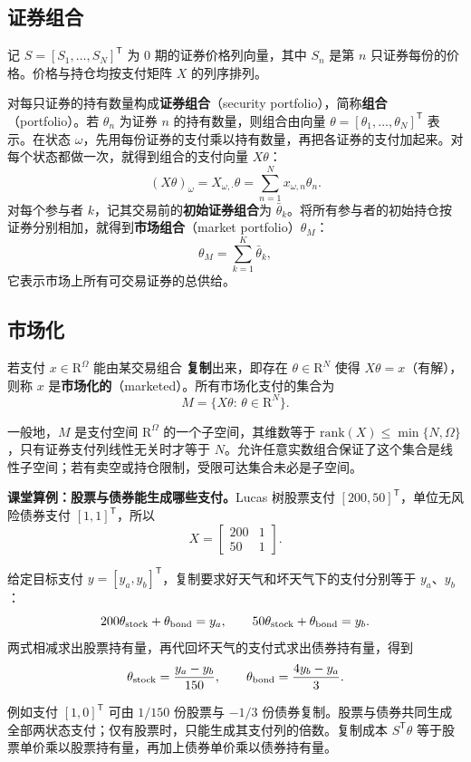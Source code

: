 \subsection{证券组合}
记 $S=[S_1,\ldots,S_N]^{\mathsf T}$ 为 $0$ 期的证券价格列向量，其中 $S_n$ 是第 $n$ 只证券每份的价格。价格与持仓均按支付矩阵 $X$ 的列序排列。

\begin{tcolorbox}[knowledge,title=证券组合与市场组合]
对每只证券的持有数量构成\textbf{证券组合}（security portfolio），简称\textbf{组合}（portfolio）。若 $\theta_n$ 为证券 $n$ 的持有数量，则组合由向量 $\theta=[\theta_1,\ldots,\theta_N]^{\mathsf T}$ 表示。在状态 $\omega$，先用每份证券的支付乘以持有数量，再把各证券的支付加起来。对每个状态都做一次，就得到组合的支付向量 $X\theta$：
    \[
        (X\theta)_\omega=X_{\omega,\cdot}\theta
        =\sum_{n=1}^N x_{\omega,n}\theta_n.
    \]
对每个参与者 $k$，记其交易前的\textbf{初始证券组合}为 $\bar\theta_k$。将所有参与者的初始持仓按证券分别相加，就得到\textbf{市场组合}（market portfolio）$\theta_M$：
    \[
        \theta_M=\sum_{k=1}^{K}\bar{\theta}_k,
    \]
    它表示市场上所有可交易证券的总供给。
\end{tcolorbox}

\subsection{市场化}
\label{sec:wj-two-marketed}
\begin{tcolorbox}[knowledge,title=市场化支付与支付空间]
若支付 $x\in\mathrm{R}^{\Omega}$ 能由某交易组合 \textbf{复制}出来，即存在 $\theta\in\mathrm{R}^{N}$ 使得 $X\theta=x$（有解），则称 $x$ 是\textbf{市场化的}（marketed）。所有市场化支付的集合为
    \[
        M=\{X\theta:\,\theta\in\mathrm{R}^{N}\}.
    \]
\end{tcolorbox}

一般地，$M$ 是支付空间 $\mathrm{R}^{\Omega}$ 的一个子空间，其维数等于 $\mathrm{rank}(X)\le\min\{N,\Omega\}$，只有证券支付列线性无关时才等于 $N$。允许任意实数组合保证了这个集合是线性子空间；若有卖空或持仓限制，受限可达集合未必是子空间。

\begin{tcolorbox}[example]
\textbf{课堂算例：股票与债券能生成哪些支付。}Lucas 树股票支付 $[200,50]^{\mathsf T}$，单位无风险债券支付 $[1,1]^{\mathsf T}$，所以
\[
 X=\begin{bmatrix}200&1\\50&1\end{bmatrix}.
\]

给定目标支付 $y=[y_a,y_b]^{\mathsf T}$，复制要求好天气和坏天气下的支付分别等于 $y_a$、$y_b$：
\[
 200\theta_{\rm stock}+\theta_{\rm bond}=y_a,\qquad
 50\theta_{\rm stock}+\theta_{\rm bond}=y_b.
\]
两式相减求出股票持有量，再代回坏天气的支付式求出债券持有量，得到
\[
 \theta_{\rm stock}=\frac{y_a-y_b}{150},\qquad
 \theta_{\rm bond}=\frac{4y_b-y_a}{3}.
\]

例如支付 $[1,0]^{\mathsf T}$ 可由 $1/150$ 份股票与 $-1/3$ 份债券复制。股票与债券共同生成全部两状态支付；仅有股票时，只能生成其支付列的倍数。复制成本 $S^{\mathsf T}\theta$ 等于股票单价乘以股票持有量，再加上债券单价乘以债券持有量。
\end{tcolorbox}

